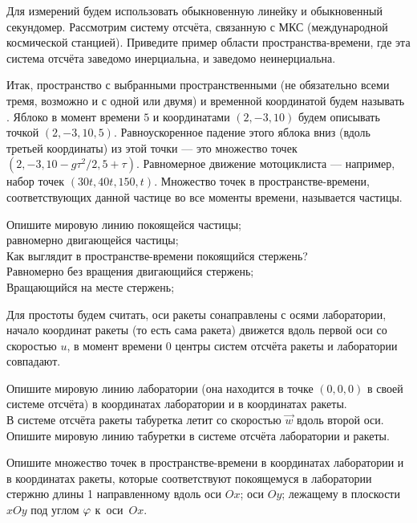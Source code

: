 \documentclass[a4paper,12pt]{article}
\begin{document}
  Для измерений будем использовать обыкновенную линейку и обыкновенный секундомер.
  Рассмотрим систему отсчёта, связанную с МКС (международной космической станцией).
  Приведите пример области пространства-времени, где эта система отсчёта заведомо инерциальна, и заведомо неинерциальна.

{\footnotesize
\spacer
Итак, пространство с выбранными пространственными (не обязательно всеми тремя, возможно и с одной или двумя) и временной координатой будем называть .
Яблоко в момент времени $5$ и координатами $(2,-3,10)$ будем описывать точкой $(2,-3,10,5)$. Равноускоренное падение этого яблока вниз (вдоль третьей координаты) из этой точки --- это множество точек $(2,-3,10-g\tau^2/2,5+\tau)$. Равномерное движение мотоциклиста --- например, набор точек $(30t,40t,150,t)$. Множество точек в пространстве-времени, соответствующих данной частице во все моменты времени, называется  частицы.
\spacer

}

    Опишите мировую линию
     покоящейся частицы;\\
     равномерно двигающейся частицы;\\
     Как выглядит в пространстве-времени покоящийся стержень?\\
     Равномерно без вращения двигающийся стержень;\\
     Вращающийся на месте стержень;


Для простоты будем считать,
оси ракеты сонаправлены с осями лаборатории, начало координат ракеты (то есть сама ракета) движется вдоль первой оси со скоростью $u$, в момент времени $0$ центры систем отсчёта ракеты и лаборатории совпадают.


    Опишите мировую линию лаборатории (она находится в точке $(0,0,0)$ в своей системе отсчёта) в координатах лаборатории и в координатах ракеты.\\
    В системе отсчёта ракеты табуретка летит со скоростью $\vec{w}$ вдоль второй оси. Опишите мировую линию табуретки в системе отсчёта лаборатории и ракеты.

  Опишите множество точек в пространстве-времени в координатах лаборатории и в координатах ракеты, которые соответствуют покоящемуся в лаборатории стержню длины 1 направленному вдоль  оси $Ox$;  оси $Oy$;  лежащему в плоскости $xOy$ под углом $\varphi$ к~оси~$Ox$.

\end{document}
